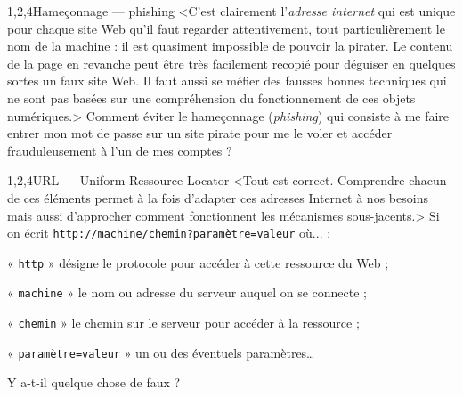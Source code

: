 \begin{quiz}[title={Web et information}]
\begin{quizquestion*}[b]{3}{1,2,4}{Hameçonnage --- {\upshape phishing}}
<C'est clairement l'\textit{adresse internet} qui est unique pour chaque site Web qu'il faut regarder attentivement, tout particulièrement le nom de la machine : il est quasiment impossible de pouvoir la pirater. Le contenu de la page en revanche peut être très facilement recopié pour déguiser en quelques sortes un faux site Web. Il faut aussi se méfier des fausses bonnes techniques qui ne sont pas basées sur une compréhension du fonctionnement de ces objets numériques.>
Comment éviter le hameçonnage (\textit{phishing}) qui consiste à me faire entrer mon mot de passe sur un site pirate pour me le voler et accéder frauduleusement à l'un de mes comptes ? 
\end{quizquestion*}

\begin{quizquestion*}[b]{3}{1,2,4}{URL --- {\upshape Uniform Ressource Locator}}
<Tout est correct. Comprendre chacun de ces éléments permet à la fois d'adapter ces adresses Internet à nos besoins mais aussi d'approcher comment fonctionnent les mécanismes sous-jacents.>
Si on écrit \texttt{http://machine/chemin?paramètre=valeur} où... :
\begin{jazzitemize}
\item « \texttt{http} » désigne le protocole pour accéder à cette ressource du Web ;
\item « \texttt{machine} » le nom ou adresse du serveur auquel on se connecte ;
\item « \texttt{chemin} » le chemin sur le serveur pour accéder à la ressource ;
\item « \texttt{paramètre=valeur} » un ou des éventuels paramètres…
\end{jazzitemize}
Y a-t-il quelque chose de faux ? 
\end{quizquestion*}
\end{quiz}

